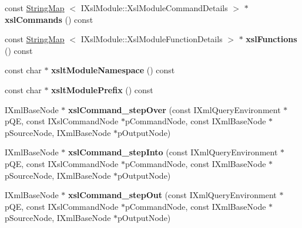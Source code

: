 \begin{DoxyCompactItemize}
\item 
\hypertarget{classgeneral__server_1_1User_a045c22bff21573fb415a4d92c0968eff}{const \hyperlink{classgeneral__server_1_1StringMap}{\-String\-Map}\*
$<$ \-I\-Xsl\-Module\-::\-Xsl\-Module\-Command\-Details $>$ $\ast$ {\bfseries xsl\-Commands} () const }\label{classgeneral__server_1_1User_a045c22bff21573fb415a4d92c0968eff}

\item 
\hypertarget{classgeneral__server_1_1User_a3b2a35d80b674a4595010257ff3807c2}{const \hyperlink{classgeneral__server_1_1StringMap}{\-String\-Map}\*
$<$ \-I\-Xsl\-Module\-::\-Xsl\-Module\-Function\-Details $>$ $\ast$ {\bfseries xsl\-Functions} () const }\label{classgeneral__server_1_1User_a3b2a35d80b674a4595010257ff3807c2}

\item 
\hypertarget{classgeneral__server_1_1User_a8acb6d322193c85f3377947de5a7759f}{const char $\ast$ {\bfseries xslt\-Module\-Namespace} () const }\label{classgeneral__server_1_1User_a8acb6d322193c85f3377947de5a7759f}

\item 
\hypertarget{classgeneral__server_1_1User_a02e1ff2299e4e080c51c1acb81a5b67b}{const char $\ast$ {\bfseries xslt\-Module\-Prefix} () const }\label{classgeneral__server_1_1User_a02e1ff2299e4e080c51c1acb81a5b67b}

\item 
\hypertarget{group__XSLModule-Commands_gaa2c2aa35950f336eaa555459f9e55131}{\-I\-Xml\-Base\-Node $\ast$ {\bfseries xsl\-Command\-\_\-step\-Over} (const \-I\-Xml\-Query\-Environment $\ast$p\-Q\-E, const \-I\-Xsl\-Command\-Node $\ast$p\-Command\-Node, const \-I\-Xml\-Base\-Node $\ast$p\-Source\-Node, \-I\-Xml\-Base\-Node $\ast$p\-Output\-Node)}\label{group__XSLModule-Commands_gaa2c2aa35950f336eaa555459f9e55131}

\item 
\hypertarget{group__XSLModule-Commands_ga57c2d185df0534c3756af28d6e80b281}{\-I\-Xml\-Base\-Node $\ast$ {\bfseries xsl\-Command\-\_\-step\-Into} (const \-I\-Xml\-Query\-Environment $\ast$p\-Q\-E, const \-I\-Xsl\-Command\-Node $\ast$p\-Command\-Node, const \-I\-Xml\-Base\-Node $\ast$p\-Source\-Node, \-I\-Xml\-Base\-Node $\ast$p\-Output\-Node)}\label{group__XSLModule-Commands_ga57c2d185df0534c3756af28d6e80b281}

\item 
\hypertarget{group__XSLModule-Commands_gabd888deeae820436366d439244d2c80a}{\-I\-Xml\-Base\-Node $\ast$ {\bfseries xsl\-Command\-\_\-step\-Out} (const \-I\-Xml\-Query\-Environment $\ast$p\-Q\-E, const \-I\-Xsl\-Command\-Node $\ast$p\-Command\-Node, const \-I\-Xml\-Base\-Node $\ast$p\-Source\-Node, \-I\-Xml\-Base\-Node $\ast$p\-Output\-Node)}\label{group__XSLModule-Commands_gabd888deeae820436366d439244d2c80a}


\end{DoxyCompactItemize}
